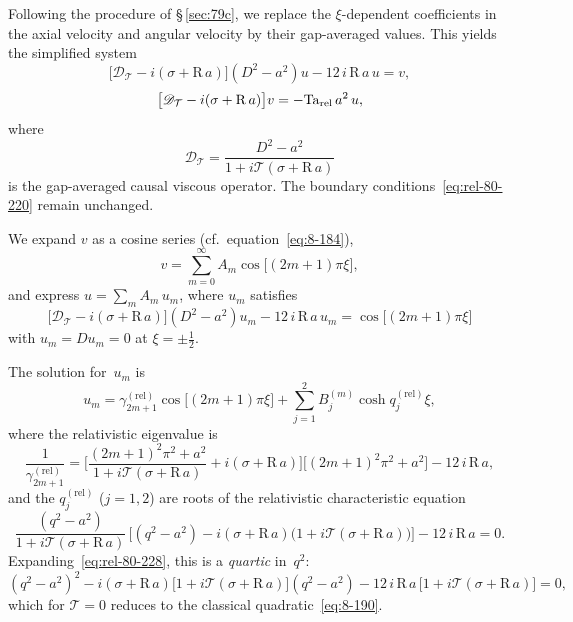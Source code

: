 Following the procedure of \S\,\ref{sec:79c}, we replace the
$\xi$-dependent coefficients in the axial velocity and angular
velocity by their gap-averaged values.  This yields the simplified
system
\begin{equation}
\label{eq:rel-80-221}
\bigl[\mathscr{D}_{\mathcal{T}}
  - i(\sigma+\mathrm{R}\,a)\bigr](D^{2}-a^{2})u
  - 12\,i\,\mathrm{R}\,a\,u = v,
\end{equation}
\begin{equation}
\label{eq:rel-80-222}
\bigl[\mathscr{D}_{\mathcal{T}}
  - i(\sigma+\mathrm{R}\,a)\bigr]v
  = -\mathrm{Ta}_{\mathrm{rel}}\,a^{2}\,u,
\end{equation}
where
\begin{equation}
\label{eq:rel-80-223}
\mathscr{D}_{\mathcal{T}}
  = \frac{D^{2}-a^{2}}{1+i\mathcal{T}(\sigma+\mathrm{R}\,a)}
\end{equation}
is the gap-averaged causal viscous operator.  The boundary
conditions~\eqref{eq:rel-80-220} remain unchanged.

We expand $v$ as a cosine series (cf.\ equation~\eqref{eq:8-184}),
\begin{equation}
\label{eq:rel-80-224}
v = \sum_{m=0}^{\infty}A_{m}\cos\bigl[(2m+1)\pi\xi\bigr],
\end{equation}
and express $u=\sum_{m}A_{m}\,u_{m}$, where $u_{m}$ satisfies
\begin{equation}
\label{eq:rel-80-225}
\bigl[\mathscr{D}_{\mathcal{T}}
  - i(\sigma+\mathrm{R}\,a)\bigr](D^{2}-a^{2})u_{m}
  - 12\,i\,\mathrm{R}\,a\,u_{m}
  = \cos\bigl[(2m+1)\pi\xi\bigr]
\end{equation}
with $u_{m}=Du_{m}=0$ at $\xi=\pm\frac{1}{2}$.

The solution for~$u_{m}$ is
\begin{equation}
\label{eq:rel-80-226}
u_{m} = \gamma_{2m+1}^{(\mathrm{rel})}
  \cos\bigl[(2m+1)\pi\xi\bigr]
  + \sum_{j=1}^{2}B_{j}^{(m)}\cosh q_{j}^{(\mathrm{rel})}\xi,
\end{equation}
where the relativistic eigenvalue is
\begin{equation}
\label{eq:rel-80-227}
\frac{1}{\gamma_{2m+1}^{(\mathrm{rel})}}
  = \biggl[\frac{(2m+1)^{2}\pi^{2}+a^{2}}
               {1+i\mathcal{T}(\sigma+\mathrm{R}\,a)}
    + i(\sigma+\mathrm{R}\,a)\biggr]
    \bigl[(2m+1)^{2}\pi^{2}+a^{2}\bigr]
  - 12\,i\,\mathrm{R}\,a,
\end{equation}
and the $q_{j}^{(\mathrm{rel})}$ ($j=1,2$) are roots of the
relativistic characteristic equation
\begin{equation}
\label{eq:rel-80-228}
\frac{(q^{2}-a^{2})}{1+i\mathcal{T}(\sigma+\mathrm{R}\,a)}\,
\bigl[(q^{2}-a^{2})
  - i(\sigma+\mathrm{R}\,a)\bigl(1+i\mathcal{T}(\sigma+\mathrm{R}\,a)\bigr)
  \bigr]
- 12\,i\,\mathrm{R}\,a = 0.
\end{equation}
Expanding~\eqref{eq:rel-80-228}, this is a \emph{quartic}
in~$q^{2}$:
\begin{equation}
\label{eq:rel-80-229}
(q^{2}-a^{2})^{2}
  - i(\sigma+\mathrm{R}\,a)\bigl[1+i\mathcal{T}(\sigma+\mathrm{R}\,a)\bigr]
    (q^{2}-a^{2})
  - 12\,i\,\mathrm{R}\,a\,\bigl[1+i\mathcal{T}(\sigma+\mathrm{R}\,a)\bigr]
  = 0,
\end{equation}
which for $\mathcal{T}=0$ reduces to the classical
quadratic~\eqref{eq:8-190}.

